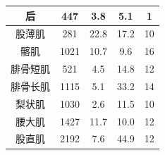 \begin{table}[htbp]
\begin{tabular}{ccccc}
		后 & 447 &  3.8 & 5.1 & 1 \\
		\midrule
		股薄肌 & 281 &  22.8 & 17.2 & 10 \\
		\midrule
		髂肌 & 1021 &  10.7 & 9.6 & 16 \\
		\midrule
		腓骨短肌 & 521 &  4.5 & 14.8 & 12 \\
		\midrule
		腓骨长肌 & 1115 &  5.1 & 33.2 & 14 \\
		\midrule
		梨状肌 & 1030 &  2.6 & 11.5 & 10 \\
		\midrule
		腰大肌 & 1427 &  11.7 & 10.0 & 12 \\
		\midrule
		股直肌 & 2192 &  7.6 & 44.9 & 12 \\
		\bottomrule
	\end{tabular}
\end{table}



